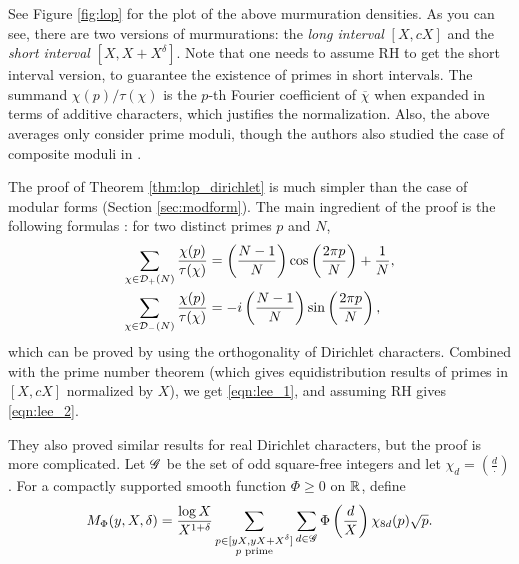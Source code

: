 See Figure \ref{fig:lop} for the plot of the above murmuration densities.
As you can see, there are two versions of murmurations: the \emph{long interval} $[X, cX]$ and the \emph{short interval} $[X, X + X^\delta]$.
Note that one needs to assume RH to get the short interval version, to guarantee the existence of primes in short intervals.
The summand $\chi(p) / \tau(\chi)$ is the $p$-th Fourier coefficient of $\overline{\chi}$ when expanded in terms of additive characters, which justifies the normalization.
Also, the above averages only consider prime moduli, though the authors also studied the case of composite moduli in \cite[Section 6.1]{lee2025murmurations}.

The proof of Theorem \ref{thm:lop_dirichlet} is much simpler than the case of modular forms (Section \ref{sec:modform}).
The main ingredient of the proof is the following formulas \cite[Lemma 2.6]{lee2025murmurations}: for two distinct primes $p$ and $N$,
\begin{align}
    \sum_{\chi \in \mathcal{D}_{+}(N)} \frac{\chi(p)}{\tau(\chi)} &= \left(\frac{N-1}{N}\right) \cos \left(\frac{2 \pi p}{N}\right) + \frac{1}{N}, \\
    \sum_{\chi \in \mathcal{D}_{-}(N)} \frac{\chi(p)}{\tau(\chi)} &= -i\left(\frac{N-1}{N}\right) \sin \left(\frac{2 \pi p}{N}\right),
\end{align}
which can be proved by using the orthogonality of Dirichlet characters.
Combined with the prime number theorem (which gives equidistribution results of primes in $[X, cX]$ normalized by $X$), we get \eqref{eqn:lee_1}, and assuming RH gives \eqref{eqn:lee_2}.

They also proved similar results for real Dirichlet characters, but the proof is more complicated.
Let $\mathscr{G}$ be the set of odd square-free integers and let $\chi_{d} = \left(\frac{d}{\cdot}\right)$.
For a compactly supported smooth function $\Phi \ge 0$ on $\mathbb{R}$, define
\begin{equation}
    M_{\Phi}(y, X, \delta) = \frac{\log X}{X^{1 + \delta}} \sum_{\substack{p \in [yX, yX + X^\delta] \\ p \text{ prime}}} \sum_{d \in \mathscr{G}} \Phi\left(\frac{d}{X}\right) \chi_{8d}(p) \sqrt{p}.
\end{equation}

